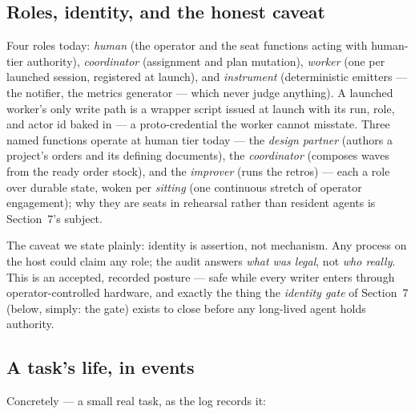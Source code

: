 \subsection{Roles, identity, and the honest caveat}

Four roles today: \emph{human} (the operator and the seat functions acting with human-tier authority), \emph{coordinator} (assignment and plan mutation), \emph{worker} (one per launched session, registered at launch), and \emph{instrument} (deterministic emitters --- the notifier, the metrics generator --- which never judge anything). A launched worker's only write path is a wrapper script issued at launch with its run, role, and actor id baked in --- a proto-credential the worker cannot misstate. Three named functions operate at human tier today --- the \emph{design partner} (authors a project's orders and its defining documents), the \emph{coordinator} (composes waves from the ready order stock), and the \emph{improver} (runs the retros) --- each a role over durable state, woken per \emph{sitting} (one continuous stretch of operator engagement); why they are seats in rehearsal rather than resident agents is Section~7's subject.

The caveat we state plainly: identity is assertion, not mechanism. Any process on the host could claim any role; the audit answers \emph{what was legal}, not \emph{who really}. This is an accepted, recorded posture --- safe while every writer enters through operator-controlled hardware, and exactly the thing the \emph{identity gate} of Section~7 (below, simply: the gate) exists to close before any long-lived agent holds authority.

\subsection{A task's life, in events}

Concretely --- a small real task, as the log records it:

